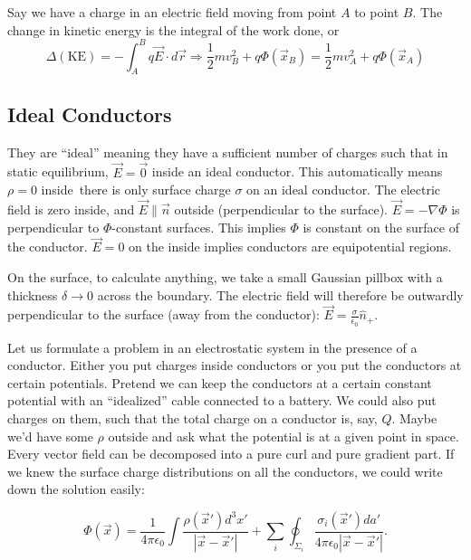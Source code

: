 \documentclass[a4paper,twoside,master.tex]{subfiles}
\begin{document}
Say we have a charge in an electric field moving from point $A$ to point $B$. The change in kinetic energy is the integral of the work done, or
\begin{equation}
    \Delta(\text{KE}) = -\int_A^Bq\vec{E}\cdot d\vec{r}\Rightarrow \frac{1}{2}mv_B^2 + q\Phi(\vec{x}_B) = \frac{1}{2}mv_A^2 + q\Phi(\vec{x}_A)
\end{equation}

\subsection{Ideal Conductors}%
\label{sub:ideal_conductors}

They are ``ideal'' meaning they have a sufficient number of charges such that in static equilibrium, $\vec{E} = \vec{0}$ inside an ideal conductor. This automatically means $\rho=0$ inside\textemdash\ there is only surface charge $\sigma$ on an ideal conductor. The electric field is zero inside, and $\vec{E}\parallel\vec{n}$ outside (perpendicular to the surface). $\vec{E} = -\nabla\Phi$ is perpendicular to $\Phi$-constant surfaces. This implies $\Phi$ is constant on the surface of the conductor. $\vec{E} = 0$ on the inside implies conductors are equipotential regions.

On the surface, to calculate anything, we take a small Gaussian pillbox with a thickness $\delta\to0$ across the boundary. The electric field will therefore be outwardly perpendicular to the surface (away from the conductor): $\vec{E} = \frac{\sigma}{\epsilon_0}\hat{n}_+$.

Let us formulate a problem in an electrostatic system in the presence of a conductor. Either you put charges inside conductors or you put the conductors at certain potentials. Pretend we can keep the conductors at a certain constant potential with an ``idealized'' cable connected to a battery. We could also put charges on them, such that the total charge on a conductor is, say, $Q$. Maybe we'd have some $\rho$ outside and ask what the potential is at a given point in space. Every vector field can be decomposed into a pure curl and pure gradient part. If we knew the surface charge distributions on all the conductors, we could write down the solution easily:

\begin{equation}
    \Phi(\vec{x}) = \frac{1}{4\pi\epsilon_0}\int\frac{\rho(\vec{x}')d^3x'}{|\vec{x}-\vec{x}'|} + \sum_i\oint_{\Sigma_i}\frac{\sigma_i(\vec{x}')da'}{4\pi\epsilon_0|\vec{x}-\vec{x}'|}.
\end{equation}
\end{document}
